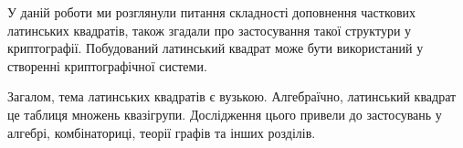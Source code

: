 У даній роботи ми розглянули питання складності доповнення часткових латинських квадратів, також згадали про застосування такої структури у криптографії.
Побудований латинський квадрат може бути використаний у створенні криптографічної системи.

Загалом, тема латинських квадратів є вузькою. Алгебраїчно, латинський квадрат це таблиця множень квазігрупи. Дослідження цього привели до застосувань у алгебрі, комбінаториці, теорії графів та інших розділів.
